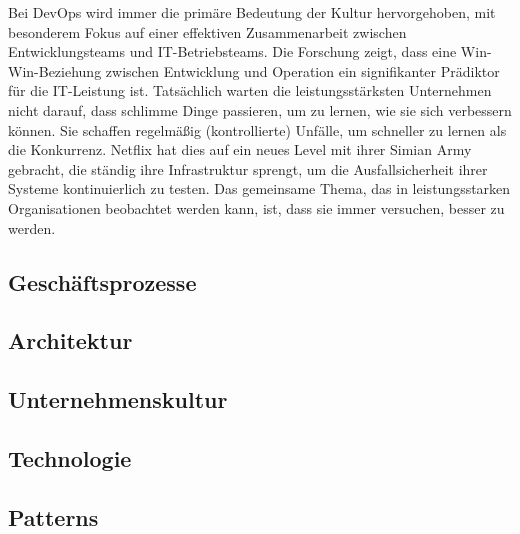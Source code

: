 Bei DevOps wird immer die primäre Bedeutung der Kultur hervorgehoben, mit besonderem Fokus auf einer effektiven Zusammenarbeit zwischen Entwicklungsteams und IT-Betriebsteams. Die Forschung zeigt, dass eine Win-Win-Beziehung zwischen Entwicklung und Operation ein signifikanter Prädiktor für die IT-Leistung ist. 
Tatsächlich warten die leistungsstärksten Unternehmen nicht darauf, dass schlimme Dinge passieren, um zu lernen, wie sie sich verbessern können. Sie schaffen regelmäßig (kontrollierte) Unfälle, um schneller zu lernen als die Konkurrenz. Netflix hat dies auf ein neues Level mit ihrer Simian Army gebracht, die ständig ihre Infrastruktur sprengt, um die Ausfallsicherheit ihrer Systeme kontinuierlich zu testen.
Das gemeinsame Thema, das in leistungsstarken Organisationen beobachtet werden kann, ist, dass sie immer versuchen, besser zu werden. 


\subsection{Geschäftsprozesse}

\subsection{Architektur}

\subsection{Unternehmenskultur}

\subsection{Technologie}

\subsection{Patterns}

